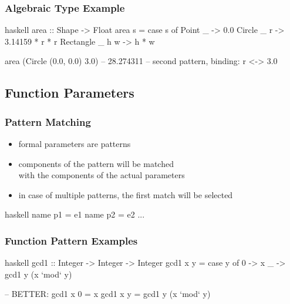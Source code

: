 \documentclass[dvipsnames]{beamer}
\theoremstyle{plain}
\begin{document}
\begin{frame}[fragile]
  \frametitle{Algebraic Type Example}

  \begin{exampleblock}{}
    \begin{pygments}{haskell}
area :: Shape -> Float
area s =
    case s of
      Point     _     -> 0.0
      Circle    _ r   -> 3.14159 * r * r
      Rectangle _ h w -> h * w

area (Circle (0.0, 0.0) 3.0)  -- 28.274311
-- second pattern, binding: r <-> 3.0
    \end{pygments}
  \end{exampleblock}
\end{frame}

\subsection{Function Parameters}

\begin{frame}[fragile]
  \frametitle{Pattern Matching}

  \begin{itemize}
    \item formal parameters are patterns
    \item components of the pattern will be matched\\
      with the components of the actual parameters
    \item in case of multiple patterns, the first match will be selected
  \end{itemize}

  \begin{block}{}
    \begin{pygments}{haskell}
name p1 = e1
name p2 = e2
...
    \end{pygments}
  \end{block}
\end{frame}

\begin{frame}[fragile]
  \frametitle{Function Pattern Examples}

  \begin{exampleblock}{}
    \begin{pygments}{haskell}
gcd1 :: Integer -> Integer -> Integer
gcd1 x y =
    case y of
      0 -> x
      _ -> gcd1 y (x `mod` y)

-- BETTER:
gcd1 x 0 = x
gcd1 x y = gcd1 y (x `mod` y)
    \end{pygments}
  \end{exampleblock}
\end{frame}
\end{document}
